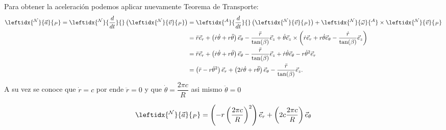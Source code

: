 \begin{tcolorbox}[title=Arbol de Navidad,breakable]
        Para obtener la aceleración podemos aplicar nuevamente Teorema de Transporte:
        \begin{align}
            \leftidx{^{\mathcal{N}}}{\vec{a}}{_P} = \leftidx{^{\mathcal{N}}}{\frac{d}{dt}}{} \left( \leftidx{^{\mathcal{N}}}{\vec{v}}{_P} \right) &= \leftidx{^{\mathcal{A}}}{\frac{d}{dt}}{} \left( \leftidx{^{\mathcal{N}}}{\vec{v}}{_P} \right) + \leftidx{^{\mathcal{N}}}{\vec{\omega}}{^{\mathcal{A}}} \times \leftidx{^{\mathcal{N}}}{\vec{v}}{_P} \\
                &= \ddot{r}\vec{e}_{r} + \left( \dot{r}\dot{\theta} + r\ddot{\theta} \right) \vec{e}_{\theta} - \frac{\ddot{r}}{\tan (\beta)} \vec{e}_z + \dot{\theta} \vec{e}_z \times \left( \dot{r}\vec{e}_{r} + r\dot{\theta} \vec{e}_{\theta} - \frac{\dot{r}}{\tan (\beta)} \vec{e}_z \right) \\
                &= \ddot{r}\vec{e}_{r} + \left( \dot{r}\dot{\theta} + r\ddot{\theta} \right) \vec{e}_{\theta} - \frac{\ddot{r}}{\tan (\beta)} \vec{e}_z + \dot{r}\dot{\theta}\vec{e}_{\theta} - r\dot{\theta}^2 \vec{e}_{r} \\
                &= \left( \ddot{r} - r\dot{\theta}^2 \right) \vec{e}_r + \left( 2\dot{r}\dot{\theta} + r\ddot{\theta} \right) \vec{e}_{\theta} - \frac{\ddot{r}}{\tan (\beta)} \vec{e}_z .
        \end{align}
        A su vez se conoce que $\dot{r}=c$ por ende $\ddot{r}=0$ y que $\dot\theta=\dfrac{2\pi c}{R}$ asi mismo  $\ddot\theta=0$

                \begin{equation}
             \leftidx{^{\mathcal{N}}}{\vec{a}}{_P}=\left(-r\left(\dfrac{2\pi c}{R}\right)^2\right)\vec{e}_r+\left(2c\dfrac{2\pi c}{R}\right)\vec{e}_{\theta}
        \end{equation}
\end{tcolorbox}
\fi
\ifmostrarSolucion
